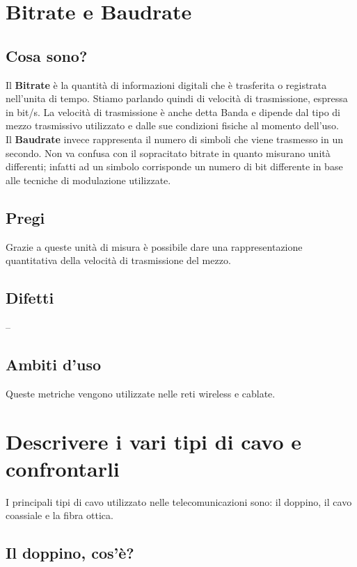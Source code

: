\section{Bitrate e Baudrate}
\subsection{Cosa sono?}
Il \textbf{Bitrate} è la quantità di informazioni digitali che è trasferita o registrata nell’unita di tempo.
Stiamo parlando quindi di velocità di trasmissione, espressa in bit/s. La velocità di trasmissione è anche detta Banda e dipende dal tipo di mezzo trasmissivo utilizzato e dalle sue condizioni fisiche al momento dell’uso.
\\
Il \textbf{Baudrate} invece rappresenta il numero di simboli che viene trasmesso in un secondo. Non va confusa con il sopracitato bitrate in quanto misurano unità differenti; infatti ad un simbolo corrisponde un numero di bit differente in base alle tecniche di modulazione utilizzate.

\subsection{Pregi}
Grazie a queste unità di misura è possibile dare una rappresentazione quantitativa della velocità di trasmissione del mezzo.

\subsection{Difetti}
--

\subsection{Ambiti d'uso}
Queste metriche vengono utilizzate nelle reti wireless e cablate.

\section{Descrivere i vari tipi di cavo e confrontarli}
I principali tipi di cavo utilizzato nelle telecomunicazioni sono: il doppino, il cavo coassiale e la fibra ottica. \\
\subsection{Il doppino, cos'è?}

